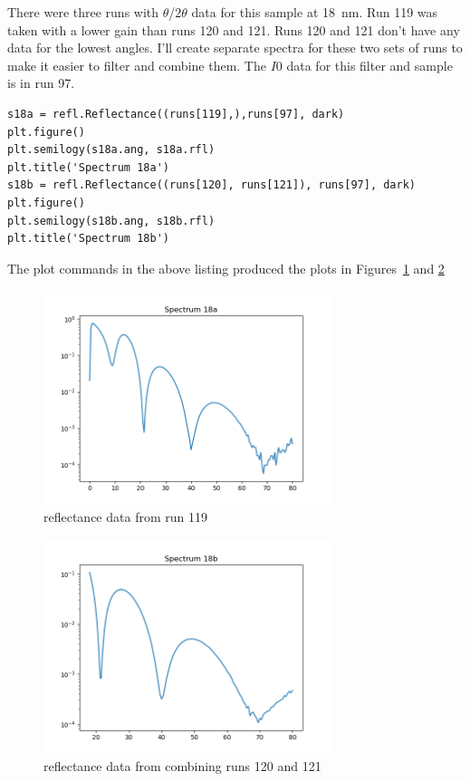 \documentclass[english]{scrartcl}
\begin{document}
There were three runs with $\theta$/$2\theta$ data for this sample at 18~nm.
Run 119 was taken with a lower gain than runs 120 and 121. Runs 120 and 121
don't have any data for the lowest angles.
I'll create separate spectra for these two sets of runs
to make it easier to filter and combine them. The $I0$ data for this filter and
sample is in run 97.
\begin{lstlisting}
s18a = refl.Reflectance((runs[119],),runs[97], dark)
plt.figure()
plt.semilogy(s18a.ang, s18a.rfl)
plt.title('Spectrum 18a')
s18b = refl.Reflectance((runs[120], runs[121]), runs[97], dark)
plt.figure()
plt.semilogy(s18b.ang, s18b.rfl)
plt.title('Spectrum 18b')
\end{lstlisting}
The plot commands in the above listing produced the plots in
Figures~\ref{fig:18a} and \ref{fig:18b}
\begin{figure}[htb]
  \begin{center}
    \includegraphics[width=0.75\textwidth]{images/r18a}
  \end{center}
  \caption{\label{fig:18a}reflectance data from run 119}
\end{figure}
\begin{figure}[htb]
  \begin{center}
    \includegraphics[width=0.75\textwidth]{images/r18b}
  \end{center}
  \caption{\label{fig:18b}reflectance data from combining runs 120 and 121}
\end{figure}
\end{document}
